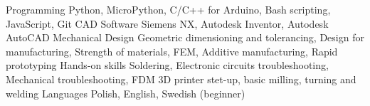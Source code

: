 

\begin{cvskills}

  \cvskill
    {Programming} %
    {Python, MicroPython, C/C++ for Arduino, Bash scripting, JavaScript, Git} %
  \cvskill
    {CAD Software} %
    {Siemens NX, Autodesk Inventor, Autodesk AutoCAD} %
  \cvskill
    {Mechanical Design} %
    {Geometric dimensioning and tolerancing, Design for manufacturing,
    \newline Strength of materials, FEM, Additive manufacturing, Rapid prototyping} %
  \cvskill
    {Hands-on skills} %
    {Soldering, Electronic circuits troubleshooting, Mechanical troubleshooting, FDM 3D printer stet-up, basic milling, turning and welding} %
  \cvskill
    {Languages} %
    {Polish, English, Swedish (beginner)} %
\end{cvskills}
